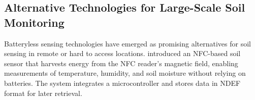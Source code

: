 \documentclass[conference]{IEEEtran}
\begin{document}




\subsection{Alternative Technologies for Large-Scale Soil Monitoring}

Batteryless sensing technologies have emerged as promising alternatives for soil sensing in remote or hard to access locations. \cite{boada_2018_batteryless} introduced an NFC-based soil sensor that harvests energy from the NFC reader’s magnetic field, enabling measurements of temperature, humidity, and soil moisture without relying on batteries. The system integrates a microcontroller and stores data in NDEF format for later retrieval. 
\end{document}
